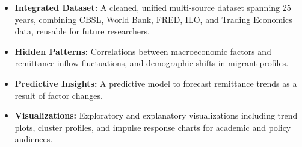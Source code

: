 \documentclass[sigconf]{acmart}
\begin{document}
\begin{itemize}
    \item \textbf{Integrated Dataset:} A cleaned, unified multi-source dataset spanning 25 years, combining CBSL, World Bank, FRED, ILO, and Trading Economics data, reusable for future researchers.

    \item \textbf{Hidden Patterns:} Correlations between macroeconomic factors and remittance inflow fluctuations, and demographic shifts in migrant profiles.

    \item \textbf{Predictive Insights:} A predictive model to forecast remittance trends as a result of factor changes.

    \item \textbf{Visualizations:} Exploratory and explanatory visualizations including trend plots, cluster profiles, and impulse response charts for academic and policy audiences.
\end{itemize}

\vspace{12pt}


\end{document}
